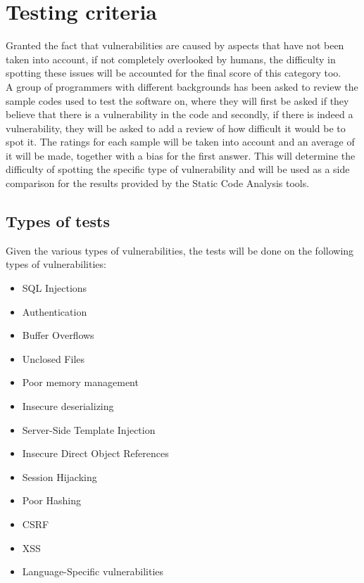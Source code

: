 \section{Testing criteria}
Granted the fact that vulnerabilities are caused by aspects that have not been taken into account, if not completely overlooked by humans, the difficulty in spotting these issues will be accounted for the final score of this category too.\smallskip\\  A group of programmers with different backgrounds has been asked to review the sample codes used to test the software on, where they will first be asked if they believe that there is a vulnerability in the code and secondly, if there is indeed a vulnerability, they will be asked to add a review of how difficult it would be to spot it. The ratings for each sample will be taken into account and an average of it will be made, together with a bias for the first answer. This will determine the difficulty of spotting the specific type of vulnerability and will be used as a side comparison for the results provided by the Static Code Analysis tools. 

\subsection{Types of tests}
Given the various types of vulnerabilities, the tests will be done on the following types of vulnerabilities:
\begin{multicols}{2}
\begin{itemize}
    \item SQL Injections
    \item Authentication
    \item Buffer Overflows
    \item Unclosed Files
    \item Poor memory management
    \item Insecure deserializing
    \item Server-Side Template Injection
    \item Insecure Direct Object References
    \item Session Hijacking
    \item Poor Hashing
    \item CSRF
    \item XSS
    \item Language-Specific vulnerabilities
\end{itemize}
\end{multicols}

